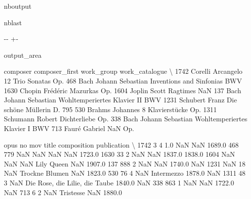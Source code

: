 \documentclass[letterpaper,10pt,english]{sphinxmanual}
\newlength\nbsphinxcodecellspacing
\begin{document}
\begin{sphinxuseclass}{nboutput}
\begin{sphinxuseclass}{nblast}
{

\kern-\sphinxverbatimsmallskipamount\kern-\baselineskip
\kern+\FrameHeightAdjust\kern-\fboxrule
\vspace{\nbsphinxcodecellspacing}

\begin{sphinxuseclass}{output_area}
\begin{sphinxuseclass}{}


\begin{sphinxVerbatim}[commandchars=\\\{\}]
\llap{\color{nbsphinxout}[6]:\,\hspace{\fboxrule}\hspace{\fboxsep}}      composer    composer\_first                   work\_group work\_catalogue  \textbackslash{}
1742   Corelli         Arcangelo              12 Trio Sonatas           Op.
468       Bach  Johann Sebastian     Inventions and Sinfonias            BWV
1630    Chopin          Frédéric                     Mazurkas            Op.
1604    Joplin             Scott                     Ragtimes            NaN
137       Bach  Johann Sebastian  Wohltemperiertes Klavier II            BWV
1231  Schubert             Franz          Die schöne Müllerin         D. 795
530     Brahms          Johannes              8 Klavierstücke            Op.
1311  Schumann            Robert                 Dichterliebe            Op.
338       Bach  Johann Sebastian   Wohltemperiertes Klavier I            BWV
713      Fauré           Gabriel                          NaN            Op.

     opus   no  mov                           title  composition  publication  \textbackslash{}
1742    3    4  1.0                             NaN          NaN       1689.0
468   779  NaN  NaN                             NaN          NaN       1723.0
1630   33    2  NaN                             NaN       1837.0       1838.0
1604  NaN  NaN  NaN                      Lily Queen          NaN       1907.0
137   888    2  NaN                             NaN       1740.0          NaN
1231  NaN   18  NaN                  Trockne Blumen          NaN       1823.0
530    76    4  NaN                      Intermezzo       1878.0          NaN
1311   48    3  NaN  Die Rose, die Lilie, die Taube       1840.0          NaN
338   863    1  NaN                             NaN       1722.0          NaN
713     6    2  NaN                       Tristesse          NaN       1880.0


\end{sphinxVerbatim}
\end{sphinxuseclass}
\end{sphinxuseclass}}
\end{sphinxuseclass}
\end{sphinxuseclass}
\end{document}
